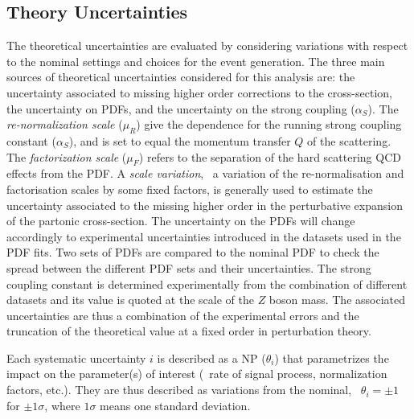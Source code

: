 	\subsection{Theory Uncertainties}
	The theoretical uncertainties are evaluated by considering variations with respect to the nominal settings and choices for the event generation.
	The three main sources of theoretical uncertainties considered for this analysis are: the uncertainty associated to missing higher order corrections to the cross-section, the uncertainty on \acp{PDF}, and the uncertainty on the strong coupling ($\alpha_S$).
	The \textit{re-normalization scale} ($\mu_R$) give the dependence for the running strong coupling constant ($\alpha_S$), and is set to equal the momentum transfer $Q$ of the scattering. 
	The \textit{factorization scale} ($\mu_F$) refers to the separation of the hard scattering \ac{QCD} effects from the \ac{PDF}. 
	A \textit{scale variation}, \ie\ a variation of the re-normalisation and factorisation scales by some fixed factors, is generally used to estimate the uncertainty associated to the missing higher order in the perturbative expansion of the partonic cross-section.
	The uncertainty on the \acp{PDF} will change accordingly to experimental uncertainties introduced in the datasets used in the \ac{PDF} fits. Two sets of \acp{PDF} are compared to the nominal \ac{PDF} to check the spread between the different \ac{PDF} sets and their uncertainties.  
	The strong coupling constant is determined experimentally from the combination of different datasets and its value is quoted at the scale of the $Z$ boson mass. The associated uncertainties are thus a combination of the experimental errors and the truncation of the theoretical value at a fixed order in perturbation theory.  
	 
	Each systematic uncertainty $i$ is described as a \ac{NP} ($\theta_i$) that parametrizes the impact on the parameter(s) of interest (\ie\ rate of signal process, normalization factors, etc.). They are thus described as variations from the nominal, \eg\ $\theta_i=\pm1$ for $\pm1\sigma$, where $1\sigma$ means one standard deviation.
	 
